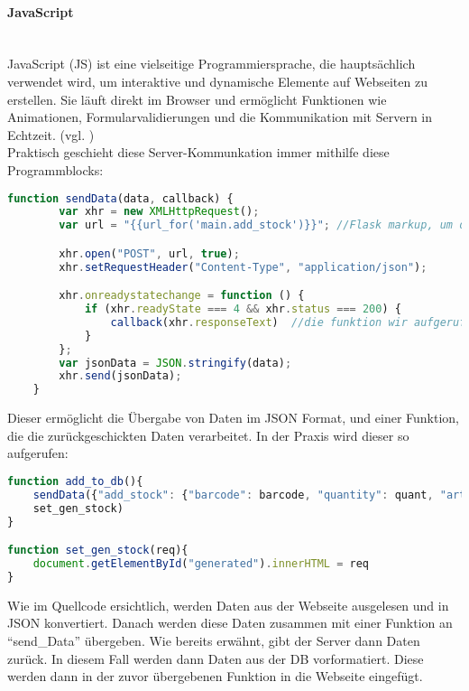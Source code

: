 \paragraph{JavaScript}\mbox{}\\
JavaScript (JS) ist eine vielseitige Programmiersprache, die hauptsächlich verwendet wird, um interaktive und dynamische Elemente auf Webseiten zu erstellen. Sie läuft direkt im Browser und ermöglicht Funktionen wie Animationen, Formularvalidierungen und die Kommunikation mit Servern in Echtzeit. (vgl. \cite{gpt_js})\\

Praktisch geschieht diese Server-Kommunkation immer mithilfe diese Programmblocks:

\begin{lstlisting}[language=JavaScript, caption=XHR-Kommunikationsblock]
    function sendData(data, callback) {
        var xhr = new XMLHttpRequest();
        var url = "{{url_for('main.add_stock')}}"; //Flask markup, um die richtige url zu erreichen, dies wird vor ausgabe auf der Webseite noch eingesetzt

        xhr.open("POST", url, true);
        xhr.setRequestHeader("Content-Type", "application/json");

        xhr.onreadystatechange = function () {
            if (xhr.readyState === 4 && xhr.status === 200) {
                callback(xhr.responseText)  //die funktion wir aufgerufen
            }
        };
        var jsonData = JSON.stringify(data);
        xhr.send(jsonData);
    }
\end{lstlisting}

Dieser ermöglicht die Übergabe von Daten im JSON Format, und einer Funktion, die die zurückgeschickten Daten verarbeitet. In der Praxis wird dieser so aufgerufen:

\begin{lstlisting}[language=JavaScript, caption=JSON-Beispiel]
function add_to_db(){
    sendData({"add_stock": {"barcode": barcode, "quantity": quant, "article": article}}, 
    set_gen_stock)
}

function set_gen_stock(req){
    document.getElementById("generated").innerHTML = req
}\end{lstlisting}

Wie im Quellcode ersichtlich, werden Daten aus der Webseite ausgelesen und in JSON konvertiert. Danach werden diese Daten zusammen mit einer Funktion an \enquote{send\_Data} übergeben. Wie bereits erwähnt, gibt der Server dann Daten zurück. In diesem Fall werden dann Daten aus der DB vorformatiert. Diese werden dann in der zuvor übergebenen Funktion in die Webseite eingefügt.

